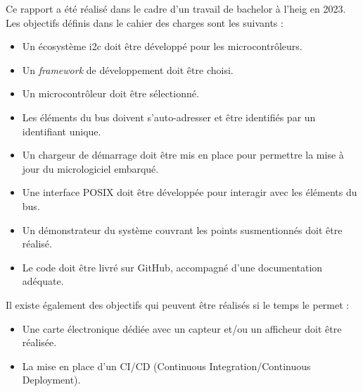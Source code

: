 Ce rapport a été réalisé dans le cadre d'un travail de bachelor à l'\gls{heig} en 2023.
Les objectifs définis dans le cahier des charges sont les suivants :

\begin{itemize}
    \item Un écosystème \gls{i2c} doit être développé pour les microcontrôleurs.
    \item Un \textit{\gls{framework}} de développement doit être choisi.
    \item Un microcontrôleur doit être sélectionné.
    \item Les éléments du bus doivent s'auto-adresser et être identifiés par un identifiant unique.
    \item Un chargeur de démarrage doit être mis en place pour permettre la mise à jour du micrologiciel embarqué.
    \item Une interface POSIX doit être développée pour interagir avec les éléments du bus.
    \item Un démonstrateur du système couvrant les points susmentionnés doit être réalisé.
    \item Le code doit être livré sur GitHub, accompagné d'une documentation adéquate.
\end{itemize}

Il existe également des objectifs qui peuvent être réalisés si le temps le permet :

\begin{itemize}
    \item Une carte électronique dédiée avec un capteur et/ou un afficheur doit être réalisée.
    \item La mise en place d'un CI/CD (Continuous Integration/Continuous Deployment).
\end{itemize}

